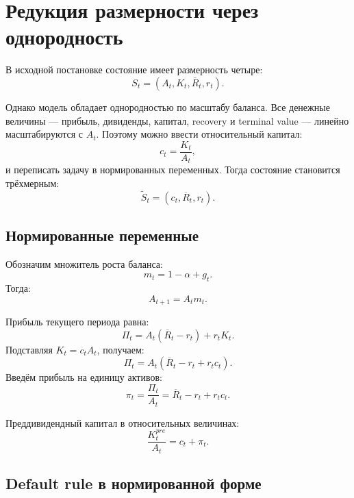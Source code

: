 \documentclass[11pt,a4paper]{article}
\newcommand{\1}{\mathbf{1}}
\begin{document}
\section{Редукция размерности через однородность}

В исходной постановке состояние имеет размерность четыре:
\begin{equation}
    S_t=(A_t,K_t,\overline{R}_t,r_t).
\end{equation}

Однако модель обладает однородностью по масштабу баланса. Все денежные величины --- прибыль, дивиденды, капитал, recovery и terminal value --- линейно масштабируются с $A_t$. Поэтому можно ввести относительный капитал:
\begin{equation}
    c_t=\frac{K_t}{A_t},
\end{equation}
и переписать задачу в нормированных переменных. Тогда состояние становится трёхмерным:
\begin{equation}
    \widetilde S_t=(c_t,\overline{R}_t,r_t).
\end{equation}

\subsection{Нормированные переменные}

Обозначим множитель роста баланса:
\begin{equation}
    m_t=1-\alpha+g_t.
\end{equation}
Тогда:
\begin{equation}
    A_{t+1}=A_tm_t.
\end{equation}

Прибыль текущего периода равна:
\begin{equation}
    \Pi_t=A_t(\overline{R}_t-r_t)+r_tK_t.
\end{equation}
Подставляя $K_t=c_tA_t$, получаем:
\begin{equation}
    \Pi_t=A_t\left(\overline{R}_t-r_t+r_tc_t\right).
\end{equation}
Введём прибыль на единицу активов:
\begin{equation}
    \pi_t=\frac{\Pi_t}{A_t}=\overline{R}_t-r_t+r_tc_t.
\end{equation}

Преддивидендный капитал в относительных величинах:
\begin{equation}
    \frac{K_t^{pre}}{A_t}=c_t+\pi_t.
\end{equation}

\subsection{Default rule в нормированной форме}
\end{document}
